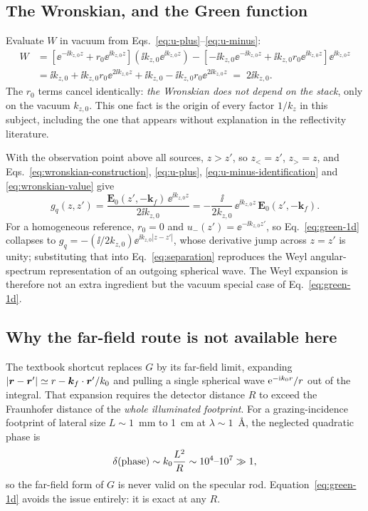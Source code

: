 \subsection{The Wronskian, and the Green function}

Evaluate $W$ in vacuum from Eqs.~\eqref{eq:u-plus}--\eqref{eq:u-minus}:
\begin{align}
  W&=\left[\ee^{-\ii k_{z,0}z}+r_0\ee^{\ii k_{z,0}z}\right]
     \left(\ii k_{z,0}\ee^{\ii k_{z,0}z}\right)
    -\left[-\ii k_{z,0}\ee^{-\ii k_{z,0}z}
       +\ii k_{z,0}r_0\ee^{\ii k_{z,0}z}\right]\ee^{\ii k_{z,0}z}\nonumber\\
   &=\ii k_{z,0}+\ii k_{z,0}r_0\ee^{2\ii k_{z,0}z}
     +\ii k_{z,0}-\ii k_{z,0}r_0\ee^{2\ii k_{z,0}z}
   \;=\;2\ii k_{z,0}.
  \label{eq:wronskian-value}
\end{align}
The $r_0$ terms cancel identically: \emph{the Wronskian does not depend on the
stack}, only on the vacuum $k_{z,0}$.  This one fact is the origin of every
factor $1/k_z$ in this subject, including the one that appears without
explanation in the reflectivity literature.

With the observation point above all sources, $z>z'$, so $z_<=z'$, $z_>=z$, and
Eqs.~\eqref{eq:wronskian-construction}, \eqref{eq:u-plus},
\eqref{eq:u-minus-identification} and \eqref{eq:wronskian-value} give
\begin{equation}
  \boxed{
  g_q(z,z')
  =\frac{\bm E_0(z',-\bm k_f)\,\ee^{\ii k_{z,0}z}}{2\ii k_{z,0}}
  =-\frac{\ii}{2k_{z,0}}\,\ee^{\ii k_{z,0}z}\,\bm E_0(z',-\bm k_f).
  }
  \label{eq:green-1d}
\end{equation}
For a homogeneous reference, $r_0=0$ and $u_-(z')=\ee^{-\ii k_{z,0}z'}$, so
Eq.~\eqref{eq:green-1d} collapses to
$g_q=-(\ii/2k_{z,0})\ee^{\ii k_{z,0}|z-z'|}$, whose derivative jump across
$z=z'$ is unity; substituting that into Eq.~\eqref{eq:separation} reproduces
the Weyl angular-spectrum representation of an outgoing spherical wave.  The
Weyl expansion is therefore not an extra ingredient but the vacuum special case
of Eq.~\eqref{eq:green-1d}.

\subsection{Why the far-field route is not available here}
\label{sec:why-not-farfield}

The textbook shortcut replaces $G$ by its far-field limit, expanding
$|\bm r-\bm r'|\simeq r-\bm k_f\cdot\bm r'/k_0$ and pulling a single
spherical wave $\mathrm{e}^{-\mathrm{i}k_0 r}/r$ out of the integral.  That expansion
requires the detector distance $R$ to exceed the Fraunhofer distance of the
\emph{whole illuminated footprint}.  For a grazing-incidence footprint of
lateral size $L\sim1$~mm to 1~cm at $\lambda\sim1$~\AA, the neglected
quadratic phase is
\begin{equation}
  \delta(\text{phase})\sim k_0\frac{L^2}{R}\sim10^{4}\text{--}10^{7}\gg1,
  \label{eq:fraunhofer-failure}
\end{equation}
so the far-field form of $G$ is never valid on the specular rod.
Equation~\eqref{eq:green-1d} avoids the issue entirely: it is exact at any $R$.

